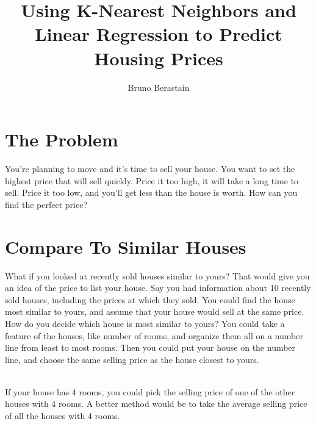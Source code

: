 \documentclass{article}
\author{Bruno Berastain}
\begin{document}
\title{Using K-Nearest Neighbors and Linear Regression to Predict Housing Prices}
\maketitle

\section{The Problem}
You're planning to move and it's time to sell your house. You want to set the highest price that will sell quickly. Price it too high, it will take a long time to sell. Price it too low, and you'll get less than the house is worth. How can you find the perfect price?

\section{Compare To Similar Houses}
What if you looked at recently sold houses similar to yours? That would give you an idea of the price to list your house. Say you had information about 10 recently sold houses, including the prices at which they sold. You could find the house most similar to yours, and assume that your house would sell at the same price. How do you decide which house is most similar to yours? You could take a feature of the houses, like number of rooms, and organize them all on a number line from least to most rooms. Then you could put your house on the number line, and choose the same selling price as the house closest to yours.\\



\\If your house has 4 rooms, you could pick the selling price of one of the other houses with 4 rooms. A better method would be to take the average selling price of all the houses with 4 rooms.\\
\end{document}
